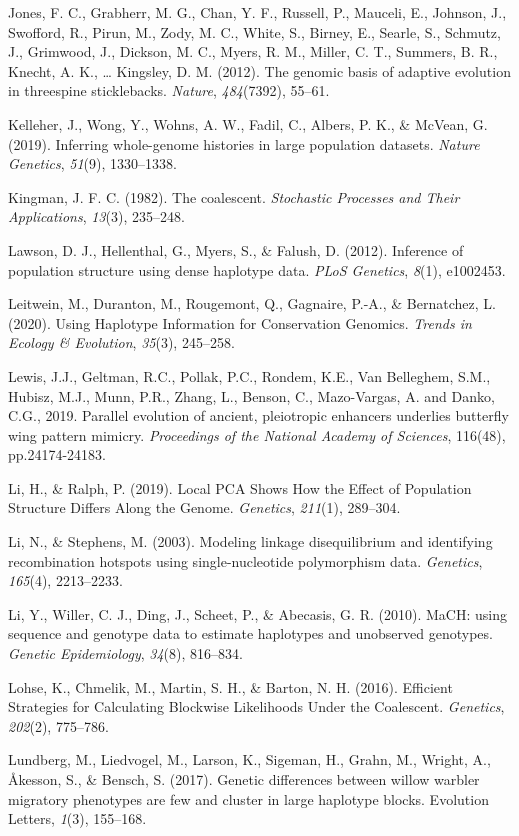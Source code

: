 \documentclass[twocolumn]{bmcart}%
\begin{document}
\begin{backmatter}
\begin{hangparas}{1em}{1}
Jones, F. C., Grabherr, M. G., Chan, Y. F., Russell, P., Mauceli, E.,
Johnson, J., Swofford, R., Pirun, M., Zody, M. C., White, S., Birney,
E., Searle, S., Schmutz, J., Grimwood, J., Dickson, M. C., Myers, R. M.,
Miller, C. T., Summers, B. R., Knecht, A. K., \ldots{} Kingsley, D. M.
(2012). The genomic basis of adaptive evolution in threespine
sticklebacks. \emph{Nature}, \emph{484}(7392), 55--61.

Kelleher, J., Wong, Y., Wohns, A. W., Fadil, C., Albers, P. K., \&
McVean, G. (2019). Inferring whole-genome histories in large population
datasets. \emph{Nature Genetics}, \emph{51}(9), 1330--1338.

Kingman, J. F. C. (1982). The coalescent. \emph{Stochastic Processes and
Their Applications}, \emph{13}(3), 235--248.

Lawson, D. J., Hellenthal, G., Myers, S., \& Falush, D. (2012).
Inference of population structure using dense haplotype data. \emph{PLoS
Genetics}, \emph{8}(1), e1002453.

Leitwein, M., Duranton, M., Rougemont, Q., Gagnaire, P.-A., \&
Bernatchez, L. (2020). Using Haplotype Information for Conservation
Genomics. \emph{Trends in Ecology \& Evolution}, \emph{35}(3), 245--258.

Lewis, J.J., Geltman, R.C., Pollak, P.C., Rondem, K.E., Van Belleghem,
S.M., Hubisz, M.J., Munn, P.R., Zhang, L., Benson, C., Mazo-Vargas, A.
and Danko, C.G., 2019. Parallel evolution of ancient, pleiotropic
enhancers underlies butterfly wing pattern mimicry. \emph{Proceedings of
the National Academy of Sciences}, 116(48), pp.24174-24183.

Li, H., \& Ralph, P. (2019). Local PCA Shows How the Effect of
Population Structure Differs Along the Genome. \emph{Genetics},
\emph{211}(1), 289--304.

Li, N., \& Stephens, M. (2003). Modeling linkage disequilibrium and
identifying recombination hotspots using single-nucleotide polymorphism
data. \emph{Genetics}, \emph{165}(4), 2213--2233.

Li, Y., Willer, C. J., Ding, J., Scheet, P., \& Abecasis, G. R. (2010).
MaCH: using sequence and genotype data to estimate haplotypes and
unobserved genotypes. \emph{Genetic Epidemiology}, \emph{34}(8),
816--834.

Lohse, K., Chmelik, M., Martin, S. H., \& Barton, N. H. (2016).
Efficient Strategies for Calculating Blockwise Likelihoods Under the
Coalescent. \emph{Genetics}, \emph{202}(2), 775--786.

Lundberg, M., Liedvogel, M., Larson, K., Sigeman, H., Grahn, M., Wright,
A., Åkesson, S., \& Bensch, S. (2017). Genetic differences between
willow warbler migratory phenotypes are few and cluster in large
haplotype blocks. Evolution Letters, \emph{1}(3), 155--168.


\end{hangparas}
\end{backmatter}
\end{document}
